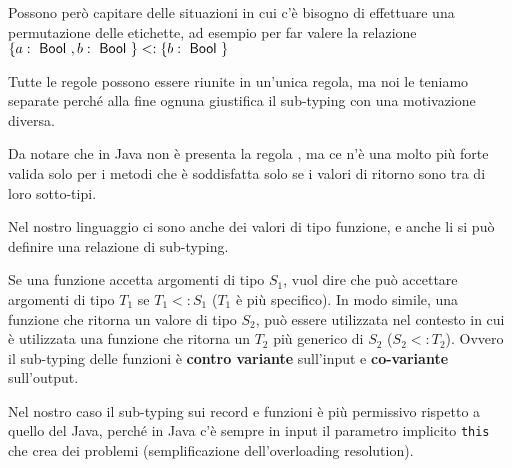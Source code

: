 \noindent Possono però capitare delle situazioni in cui c'è bisogno di effettuare una permutazione delle etichette, ad esempio per far valere la relazione $\{a : \Bool, b: \Bool \} <: \{ b: \Bool\}$
\begin{prooftree}
\end{prooftree}

\noindent Tutte le regole possono essere riunite in un'unica regola, ma noi le teniamo separate perché alla fine ognuna giustifica il sub-typing con una motivazione diversa.

Da notare che in Java non è presenta la regola , ma ce n'è una molto più forte valida solo per i metodi che è soddisfatta solo se i valori di ritorno sono tra di loro sotto-tipi.

Nel nostro linguaggio ci sono anche dei valori di tipo funzione, e anche li si può definire una relazione di sub-typing.

\begin{prooftree}
\end{prooftree}

\noindent Se una funzione accetta argomenti di tipo $S_1$, vuol dire che può accettare argomenti di tipo $T_1$ se $T_1 <: S_1$ ($T_1$ è più specifico). In modo simile, una funzione che ritorna un valore di tipo $S_2$, può essere utilizzata nel contesto in cui è utilizzata una funzione che ritorna un $T_2$ più generico di $S_2$ ($S_2 <: T_2$). Ovvero il sub-typing delle funzioni è \textbf{contro variante} sull'input e \textbf{co-variante} sull'output.

\begin{prooftree}
\end{prooftree}

\noindent Nel nostro caso il sub-typing sui record e funzioni è più permissivo rispetto a quello del Java, perché in Java c'è sempre in input il parametro implicito \texttt{this} che crea dei problemi (semplificazione dell'overloading resolution).

